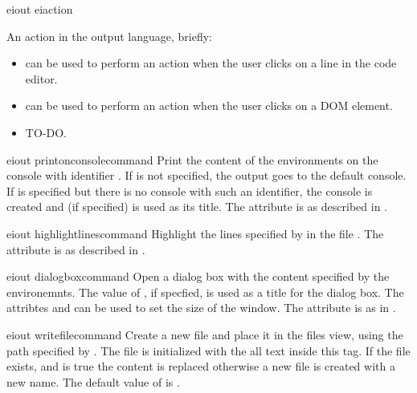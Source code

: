 \bigskip
\xmlstruct
{eiout}
{eiaction}
{%
An action in the \ei output language, briefly:
\begin{itemize}
%
\item {} can be used to perform an action
  when the user clicks on a line in the code editor.
%
\item {} can be used to perform an action
  when the user clicks on a DOM element.
%
\item {} TO-DO.
%
\end{itemize}
}


\bigskip
\xmlstruct
{eiout}
{printonconsolecommand}
{%
%
  Print the content of the  environments on the
  console with identifier .
%
  If  is not specified, the output goes to
  the default console.
%
  If  is specified but there is no console
  with such an identifier, the console is created and
   (if specified) is used as its title.
%
  The attribute  is as described in
  .
%
} 

\bigskip
\xmlstruct
{eiout}
{highlightlinescommand}
{%
%
  Highlight the lines specified by  in the file
  . The attribute  is as
  described in .
%
}


\bigskip
\xmlstruct
{eiout}
{dialogboxcommand}
{%
  Open a dialog box with the content specified by the
   environemnts. The value of
  , if specfied, is used as a title for the
  dialog box. The attribtes  and
   can be used to set the size of the window.
  The attribute  is as in
  .
%
}


\bigskip 
\xmlstruct 
{eiout}
{writefilecommand} 
{%
%
  Create a new file and place it in the files view, using the path
  specified by . The file is initialized with
  the all text  inside this tag. If the file
  exists, and  is true the content is
  replaced otherwise a new file is created with a new name. The
  default value of  is
  .
% 
%
}


